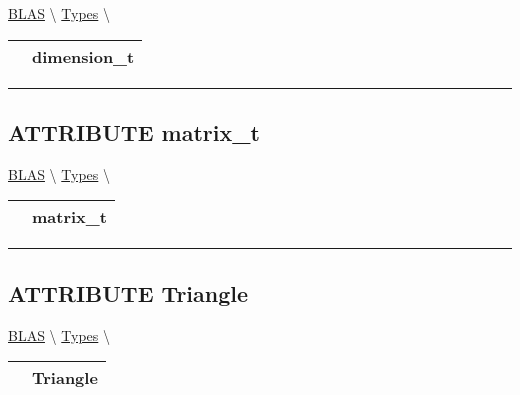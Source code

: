\hypertarget{ecldoc:blas.types.dimension_t}{}
\hspace{0pt} \hyperlink{ecldoc:BLAS}{BLAS} \textbackslash 
\hspace{0pt} \hyperlink{ecldoc:BLAS.Types}{Types} \textbackslash 

{\renewcommand{\arraystretch}{1.5}
\begin{tabularx}{\textwidth}{|>{\raggedright\arraybackslash}l|X|}
\hline
\hspace{0pt}\mytexttt{\color{red} } & \textbf{dimension\_t} \\
\hline
\end{tabularx}
}

\par


\rule{\linewidth}{0.5pt}
\subsection*{\textsf{\colorbox{headtoc}{\color{white} ATTRIBUTE}
matrix\_t}}

\hypertarget{ecldoc:blas.types.matrix_t}{}
\hspace{0pt} \hyperlink{ecldoc:BLAS}{BLAS} \textbackslash 
\hspace{0pt} \hyperlink{ecldoc:BLAS.Types}{Types} \textbackslash 

{\renewcommand{\arraystretch}{1.5}
\begin{tabularx}{\textwidth}{|>{\raggedright\arraybackslash}l|X|}
\hline
\hspace{0pt}\mytexttt{\color{red} } & \textbf{matrix\_t} \\
\hline
\end{tabularx}
}

\par


\rule{\linewidth}{0.5pt}
\subsection*{\textsf{\colorbox{headtoc}{\color{white} ATTRIBUTE}
Triangle}}

\hypertarget{ecldoc:ecldoc-Triangle}{}
\hspace{0pt} \hyperlink{ecldoc:BLAS}{BLAS} \textbackslash 
\hspace{0pt} \hyperlink{ecldoc:BLAS.Types}{Types} \textbackslash 

{\renewcommand{\arraystretch}{1.5}
\begin{tabularx}{\textwidth}{|>{\raggedright\arraybackslash}l|X|}
\hline
\hspace{0pt}\mytexttt{\color{red} } & \textbf{Triangle} \\
\hline
\end{tabularx}
}

